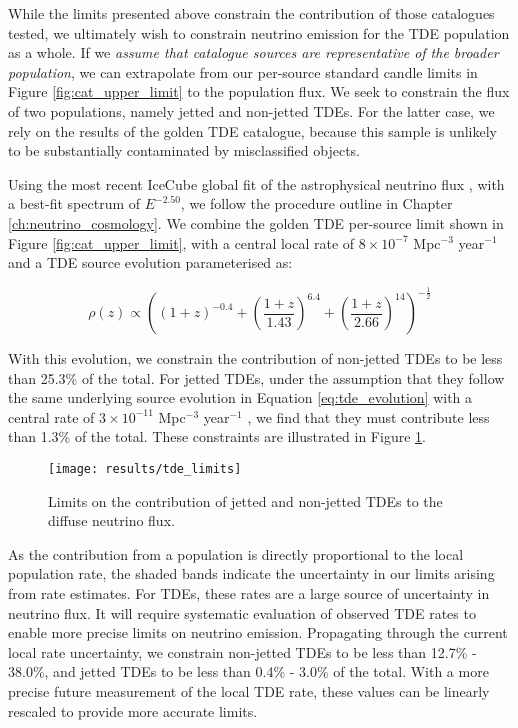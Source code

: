 While the limits presented above constrain the contribution of those catalogues tested, we ultimately wish to constrain neutrino emission for the TDE population as a whole. If we \emph{assume that catalogue sources are representative of the broader population}, we can extrapolate from our per-source standard candle limits in Figure \ref{fig:cat_upper_limit} to the population flux. We seek to constrain the flux of two populations, namely jetted and non-jetted TDEs. For the latter case, we rely on the results of the golden TDE catalogue, because this sample is unlikely to be substantially contaminated by misclassified objects.

Using the most recent IceCube global fit of the astrophysical neutrino flux , with a best-fit spectrum of $E^{-2.50}$, we follow the procedure outline in Chapter \ref{ch:neutrino_cosmology}. We combine the golden TDE per-source limit shown in Figure \ref{fig:cat_upper_limit}, with a central local rate of $8 \times 10^{-7}$ Mpc$^{-3}$ year$^{-1}$  and a TDE source evolution  parameterised as:

\begin{equation}
\rho(z) \propto \left( (1 + z)^{-0.4} + \left( \frac{1 + z}{1.43} \right)^{6.4} +
\left( \frac{1 + z}{2.66} \right)^{14}
\right)^{-\frac{1}{2}}
\label{eq:tde_evolution}
\end{equation}

With this evolution, we constrain the contribution of non-jetted TDEs to be less than 25.3\% of the total. For jetted TDEs, under the assumption that they follow the same underlying source evolution in Equation \ref{eq:tde_evolution} with a central rate of $3 \times 10^{-11}$ Mpc$^{-3}$ year$^{-1}$ \cite{Sun:2015bda}, we find that they must contribute less than 1.3\% of the total.  These constraints are illustrated in Figure \ref{fig:DiffuseFlux}. 

\begin{figure}[!ht]
	\centering \texttt{[image: results/tde\_limits]}
	\caption{Limits on the contribution of jetted and non-jetted TDEs to the diffuse neutrino flux.}
	\label{fig:DiffuseFlux}
\end{figure}

As the contribution from a population is directly proportional to the local population rate, the shaded bands indicate the uncertainty in our limits arising from rate estimates. For TDEs, these rates are a large source of uncertainty in neutrino flux. It will require systematic evaluation of observed TDE rates to enable more precise limits on neutrino emission. Propagating through the current local rate uncertainty, we constrain non-jetted TDEs to be less than 12.7\% - 38.0\%, and jetted TDEs to be less than 0.4\% - 3.0\% of the total. With a more precise future measurement of the local TDE rate, these values can be linearly rescaled to provide more accurate limits.

